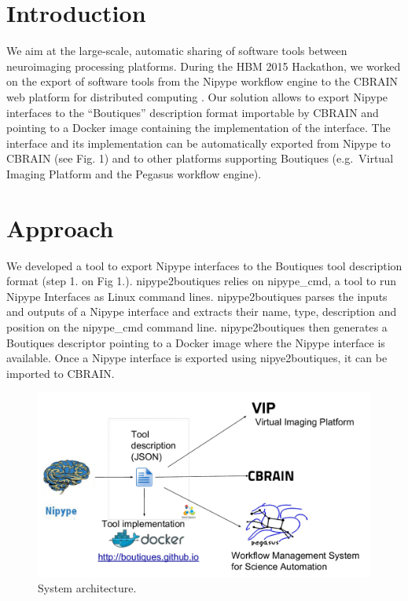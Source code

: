 \documentclass[twocolumn]{bmcart}%
\begin{document}

\section{Introduction}\label{introduction}

We aim at the large-scale, automatic sharing of software tools between
neuroimaging processing platforms. During the HBM 2015 Hackathon, we
worked on the export of software tools from the Nipype workflow engine
\cite{Gorgolewski2011} to the CBRAIN web platform for distributed
computing \cite{sherif2014cbrain}. Our solution allows to export Nipype
interfaces to the ``Boutiques'' description format importable by CBRAIN
and pointing to a Docker image containing the implementation of the
interface. The interface and its implementation can be automatically
exported from Nipype to CBRAIN (see Fig. 1) and to other platforms
supporting Boutiques (e.g.~Virtual Imaging Platform and the Pegasus
workflow engine).

\section{Approach}\label{approach}

We developed a tool to export Nipype interfaces to the Boutiques tool
description format (step 1. on Fig 1.). nipype2boutiques relies on
nipype\_cmd, a tool to run Nipype Interfaces as Linux command lines.
nipype2boutiques parses the inputs and outputs of a Nipype interface and
extracts their name, type, description and position on the nipype\_cmd
command line. nipype2boutiques then generates a Boutiques descriptor
pointing to a Docker image where the Nipype interface is available. Once
a Nipype interface is exported using nipye2boutiques, it can be imported
to CBRAIN.

\begin{figure}[h!]
  \includegraphics[width=.47\textwidth]{architecture.pdf}
  \caption{\label{centfig} System architecture.}
\end{figure}
\end{document}

